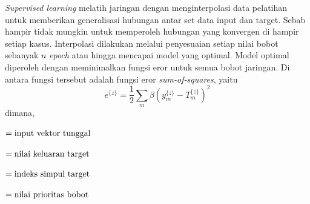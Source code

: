 \textit{Supervised learning} melatih jaringan dengan menginterpolasi data pelatihan untuk memberikan generalisasi hubungan antar set data input dan target. Sebab hampir tidak mungkin untuk memperoleh hubungan yang konvergen di hampir setiap kasus. Interpolasi dilakukan melalui penyesuaian setiap nilai bobot sebanyak $n$ \textit{epoch} atau hingga mencapai model yang optimal. Model optimal diperoleh dengan meminimalkan fungsi eror untuk semua bobot jaringan. Di antara fungsi tersebut adalah fungsi eror \textit{sum-of-squares}, yaitu 
\begin{equation}
    e^{\{z\}} = \frac{1}{2}\sum_m{\beta(y^{\{z\}}_m-T^{\{z\}}_m)^2}
    \label{equ:sos}
\end{equation}
dimana,
\begin{description}[align=parleft,labelwidth=1cm]
    \item[$z$] $= \parbox[t]{10.35cm}{input vektor tunggal}$
    \item[$T_m$] $= \parbox[t]{10.35cm}{nilai keluaran target}$
    \item[$m$] $= \parbox[t]{10.35cm}{indeks simpul target}$
    \item[$\beta_m$] $= \parbox[t]{10.35cm}{nilai prioritas bobot}$
\end{description}

